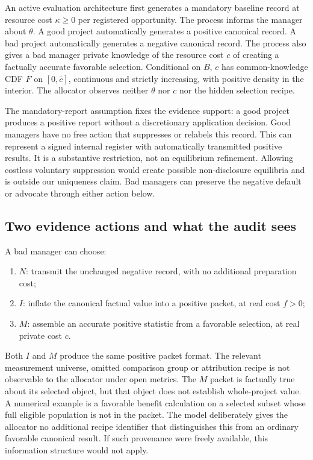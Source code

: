 \documentclass[11pt]{article}
\begin{document}
An active evaluation architecture first generates a mandatory baseline record at resource cost $\kappa\geq0$ per registered opportunity. The process informs the manager about $\theta$. A good project automatically generates a positive canonical record. A bad project automatically generates a negative canonical record. The process also gives a bad manager private knowledge of the resource cost $c$ of creating a factually accurate favorable selection. Conditional on $B$, $c$ has common-knowledge CDF $F$ on $[0,\bar c]$, continuous and strictly increasing, with positive density in the interior. The allocator observes neither $\theta$ nor $c$ nor the hidden selection recipe.

The mandatory-report assumption fixes the evidence support: a good project produces a positive report without a discretionary application decision. Good managers have no free action that suppresses or relabels this record. This can represent a signed internal register with automatically transmitted positive results. It is a substantive restriction, not an equilibrium refinement. Allowing costless voluntary suppression would create possible non-disclosure equilibria and is outside our uniqueness claim. Bad managers can preserve the negative default or advocate through either action below.
\subsection{Two evidence actions and what the audit sees}\label{subsec:technology}
A bad manager can choose:
\begin{enumerate}
\item $N$: transmit the unchanged negative record, with no additional preparation cost;
\item $I$: inflate the canonical factual value into a positive packet, at real cost $f>0$;
\item $M$: assemble an accurate positive statistic from a favorable selection, at real private cost $c$.
\end{enumerate}
Both $I$ and $M$ produce the same positive packet format. The relevant measurement universe, omitted comparison group or attribution recipe is not observable to the allocator under open metrics. The $M$ packet is factually true about its selected object, but that object does not establish whole-project value. A numerical example is a favorable benefit calculation on a selected subset whose full eligible population is not in the packet. The model deliberately gives the allocator no additional recipe identifier that distinguishes this from an ordinary favorable canonical result. If such provenance were freely available, this information structure would not apply.
\end{document}
